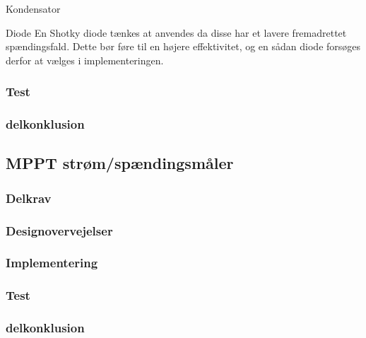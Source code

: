 \documentclass[../main.tex]{subfiles}
\begin{document}
            
            Kondensator
            
            
            
            Diode
            En Shotky diode tænkes at anvendes da disse har et lavere fremadrettet spændingsfald. Dette bør føre til en højere effektivitet, og en sådan diode forsøges derfor at vælges i implementeringen.
            
            
            
        \subsubsection{Test}
            
            
            
            
        \subsubsection{delkonklusion}
            
            
            
            
    \subsection{MPPT strøm/spændingsmåler}
            
        \subsubsection{Delkrav}
            
        \subsubsection{Designovervejelser}
            
        \subsubsection{Implementering}
            
        \subsubsection{Test}
            
        \subsubsection{delkonklusion}
            
\end{document}
